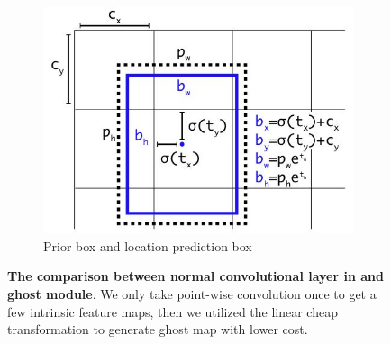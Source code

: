 \begin{figure}[h]
\begin{center}
\begin{subfigure}[b]{0.49\textwidth}
			\includegraphics[width=\textwidth]{thesis-template-master/images/anchor.JPG}
			\caption{ Prior box and location prediction box}
			\label{fig:res18}
		\end{subfigure}
	\end{center}
	\caption{\textbf{The comparison between normal convolutional layer in \cite{26}\cite{27}\cite{28} and ghost module}. We only take point-wise convolution once to get a few intrinsic feature maps, then we utilized the linear cheap transformation to generate ghost map with lower cost.}
\end{figure}

